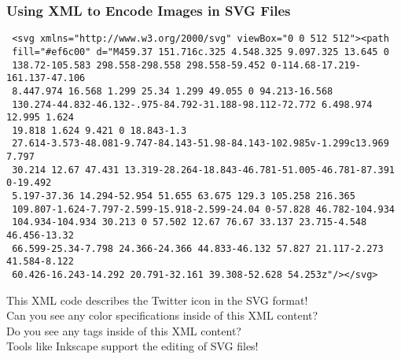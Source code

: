\documentclass[14pt,aspectratio=169]{beamer}
\begin{document}
%
\begin{frame}[fragile]
  \frametitle{Using XML to Encode Images in SVG Files}
  \normalsize
  \begin{minipage}{6in}
    \vspace*{.05in}
    \begin{verbatim}
 <svg xmlns="http://www.w3.org/2000/svg" viewBox="0 0 512 512"><path
 fill="#ef6c00" d="M459.37 151.716c.325 4.548.325 9.097.325 13.645 0
 138.72-105.583 298.558-298.558 298.558-59.452 0-114.68-17.219-161.137-47.106
 8.447.974 16.568 1.299 25.34 1.299 49.055 0 94.213-16.568
 130.274-44.832-46.132-.975-84.792-31.188-98.112-72.772 6.498.974 12.995 1.624
 19.818 1.624 9.421 0 18.843-1.3
 27.614-3.573-48.081-9.747-84.143-51.98-84.143-102.985v-1.299c13.969 7.797
 30.214 12.67 47.431 13.319-28.264-18.843-46.781-51.005-46.781-87.391 0-19.492
 5.197-37.36 14.294-52.954 51.655 63.675 129.3 105.258 216.365
 109.807-1.624-7.797-2.599-15.918-2.599-24.04 0-57.828 46.782-104.934
 104.934-104.934 30.213 0 57.502 12.67 76.67 33.137 23.715-4.548 46.456-13.32
 66.599-25.34-7.798 24.366-24.366 44.833-46.132 57.827 21.117-2.273 41.584-8.122
 60.426-16.243-14.292 20.791-32.161 39.308-52.628 54.253z"/></svg>
    \end{verbatim}
  \end{minipage}
  \vspace*{.05in}
  \begin{center}
    This XML code describes the Twitter icon in the SVG format! \\
    Can you see any color specifications inside of this XML content? \\
    Do you see any tags inside of this XML content? \\
    Tools like Inkscape support the editing of SVG files!
  \end{center}
\end{frame}
\end{document}
